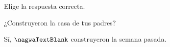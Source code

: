 
\begin{question}

\begin{instance}
    
\begin{mcq}[standalone=false]
      
\begin{stem}
        Elige la respuesta correcta.\par
        
\begin{enumerationnolabel}
          \item{¿Construyeron la casa de tus padres?}          
          \item{Sí, $\nagwaTextBlank$  construyeron la semana pasada.}        
\end{enumerationnolabel}
      
\end{stem}
      
\begin{distractors}
\end{distractors}
                      
\end{mcq}
  
\end{instance}

\end{question}
